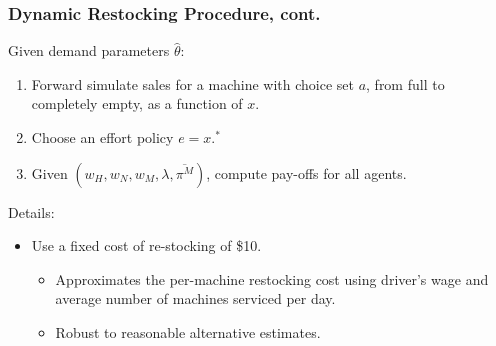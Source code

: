 \begin{frame}
\frametitle{Dynamic Restocking Procedure, cont.}
Given demand parameters $\hat{\theta}$:
\begin{enumerate}
\item Forward simulate sales for a machine with choice set $a$, from full to completely empty, as a function of $x$.
\item Choose an effort policy $e = x.^{*}$
\item Given $(w_H, w_N,w_M,\lambda,\overline{\pi^M})$, compute pay-offs for all agents.
\end{enumerate}
Details:
\begin{itemize}
\item Use a fixed cost of re-stocking of \$10. 
	\begin{itemize}
	\item Approximates the per-machine restocking cost using driver's wage and average number of machines serviced per day.
	\item Robust to reasonable alternative estimates.
	\end{itemize}
\end{itemize}
\end{frame}

